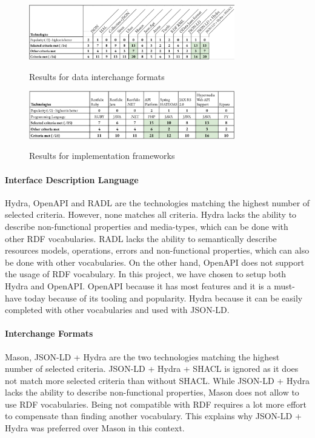 \begin{figure}[ht]
\caption{Results for data interchange formats}
\centering
\includegraphics[width=0.8\textwidth]{figures/example-dif-results.png}
\label{example-dif-results}
\vspace*{-0.5cm}
\end{figure}

\begin{figure}[ht]
\caption{Results for implementation frameworks}
\centering
\includegraphics[width=0.8\textwidth]{figures/example-frameworks-results.png}
\label{example-frameworks-results}
\vspace*{-0.3cm}
\end{figure}

\paragraph{Interface Description Language}
Hydra, OpenAPI and RADL are the technologies matching the highest number of selected criteria. However, none matches all criteria. Hydra lacks the ability to describe non-functional properties and media-types, which can be done with other RDF vocabularies. RADL lacks the ability to semantically describe resources models, operations, errors and non-functional properties, which can also be done with other vocabularies. On the other hand, OpenAPI does not support the usage of RDF vocabulary. 
In this project, we have chosen to setup both Hydra and OpenAPI. OpenAPI because it has most features and it is a must-have today because of its tooling and popularity. Hydra because it can be easily completed with other vocabularies and used with JSON-LD.

\paragraph{Interchange Formats}
Mason, JSON-LD + Hydra are the two technologies matching the highest number of selected criteria. JSON-LD + Hydra + SHACL is ignored as it does not match more selected criteria than without SHACL. While JSON-LD + Hydra lacks the ability to describe non-functional properties, Mason does not allow to use RDF vocabularies. Being not compatible with RDF requires a lot more effort to compensate than finding another vocabulary. This explains why JSON-LD + Hydra was preferred over Mason in this context.

